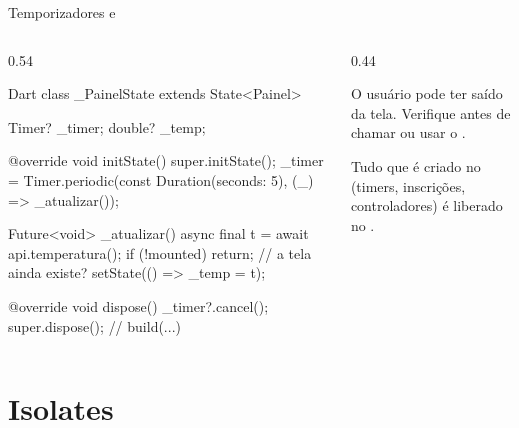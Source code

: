 \documentclass[aspectratio=169,10pt]{beamer}
\begin{document}
\begin{frame}[fragile]{Temporizadores e }
  \begin{columns}[T]
    \begin{column}{0.54\textwidth}
\begin{codigo}[title=Atualização periódica]{Dart}
class _PainelState extends State<Painel> {
  Timer? _timer;
  double? _temp;

  @override
  void initState() {
    super.initState();
    _timer = Timer.periodic(const Duration(seconds: 5),
        (_) => _atualizar());
  }

  Future<void> _atualizar() async {
    final t = await api.temperatura();
    if (!mounted) return;            // a tela ainda existe?
    setState(() => _temp = t);
  }

  @override
  void dispose() { _timer?.cancel(); super.dispose(); }
  // build(...)
}
\end{codigo}
    \end{column}
    \begin{column}{0.44\textwidth}
      \begin{atencao}
        O usuário pode ter saído da tela. Verifique  antes de chamar  ou usar o .
      \end{atencao}
      \begin{conceito}[Limpeza]
        Tudo que é criado no  (timers, inscrições, controladores) é liberado no .
      \end{conceito}
    \end{column}
  \end{columns}
\end{frame}

\section{Isolates}
\end{document}
